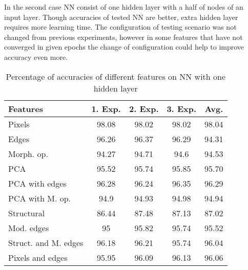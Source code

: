 \documentclass[journal]{IEEEtran}
\begin{document}
In the second case NN consist of one hidden layer with a half of nodes of an input layer. Though accuracies of tested NN are better, extra hidden layer requires more learning time. The configuration of testing scenario was not changed from previous experiments, however in some features that have not converged in given epochs the change of configuration could help to improve accuracy even more.
\begin{table}
  \centering
  \caption{Percentage of accuracies of different features on NN with one hidden layer}
  \begin{tabular}{|l||c|c|c|c|}
  \hline
    Features & 1. Exp. & 2. Exp. & 3. Exp. & Avg. \\
  \hline
  \hline
  Pixels & 98.08 & 98.02 & 98.02 & 98.04 \\
  \hline
  Edges & 96.26 & 96.37 &  96.29 &  94.31 \\ 
  \hline
 Morph. op. & 94.27 & 94.71 & 94.6 & 94.53\\
 \hline
 PCA & 95.52 & 95.74 & 95.85 & 95.70\\
 \hline
 PCA with edges & 96.28 &   96.24 &  96.35 & 96.29 \\
 \hline
 PCA with M. op. &  94.9 & 94.93 & 94.98 & 94.94\\
 \hline
 Structural &  86.44 &  87.48 & 87.13 &  87.02\\
 \hline
 Mod. edges & 95 &  95.82 &  95.74 &  95.52\\
 \hline
 Struct. and M. edges & 96.18 & 96.21 &  95.74 &  96.04\\
 \hline
 Pixels and edges & 95.95 & 96.09 &  96.13 & 96.06\\
 \hline
  \end{tabular}
  \label{tab:extab2}
\end{table}
\end{document}
